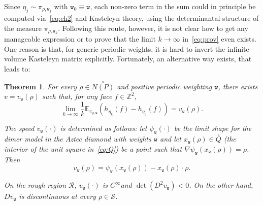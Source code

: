 \documentclass[10pt]{amsart}
\newtheorem{theo}{Theorem}[section]
\theoremstyle{definition}\newtheorem{defi}[theo]{Definition}\newtheorem{rema}[theo]{Remark}\newtheorem{exam}[theo]{Example}\newtheorem{exem}[theo]{Example}\newtheorem{nota}[theo]{Notation}
\newcommand{\ttw}{\mathtt{w}}
\newcommand{\bbE}{\mathbb{E}}
\newcommand{\bbZ}{\mathbb{Z}}
\newcommand{\clS}{\mathcal{S}}
\newcommand{\clR}{\mathcal{R}}
\begin{document}
Since $\eta_j\sim \pi_{\rho,\ttw_j}$ with $\ttw_0\equiv \ttw$, each non-zero term in the sum could in principle be computed via~\eqref{eq:ch2} and Kasteleyn theory, using the determinantal structure of the measure $\pi_{\rho,\ttw_k}$. Following this route, however, it is not clear how to get any manageable expression or to prove that the limit $k\to\infty$ in~\eqref{eq:prov} even exists. One reason is that, for generic periodic weights, it is hard to invert the infinite-volume Kasteleyn matrix explicitly. Fortunately, an alternative way exists, that leads to:

\begin{theo}\label{th:1}
For every $\rho\in\stackrel\circ{N(P)}$ and positive periodic weighting $\ttw$, there exists $v=v_{\ttw}(\rho)$ such that, for any face $f\in \bbZ^2$,
\begin{equation}\label{eq:v}
\lim_{k\to\infty}\frac1k\bbE_{\pi_{\rho,{\ttw}}} \left(h_{\eta_{k}}(f)-h_{\eta_{0}}(f)\right)=v_{\ttw}(\rho).
\end{equation}


The speed $v_{\ttw}(\cdot)$ is determined as follows: let $\psi_{\ttw}(\cdot)$ be the limit shape for the dimer model in the Aztec diamond with weights $\ttw$ and let $x_{\ttw}(\rho)\in \stackrel\circ Q$ (the interior of the unit square in~\eqref{eq:Q}) be a point such that $\nabla \psi_{\ttw}(x_{\ttw}(\rho))=\rho$. Then
\begin{equation}\label{eq:chiev}
v_{\ttw}(\rho)=\psi_{\ttw}(x_{\ttw}(\rho))-x_{\ttw}(\rho)\cdot \rho.
\end{equation}

On the rough region $\clR$, $v_{\ttw}(\cdot)$ is $C^\infty$and $\det(D^2 v_{\ttw})< 0$. On the other hand, $D v_{\ttw}$ is discontinuous at every $\rho\in \clS$.
\end{theo}
\end{document}
